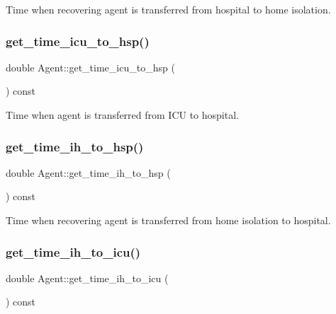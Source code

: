 Time when recovering agent is transferred from hospital to home isolation. 

\mbox{\label{classAgent_ae3b4045c981c44fb9eeed130246ea0a6}} 
\subsubsection{\texorpdfstring{get\+\_\+time\+\_\+icu\+\_\+to\+\_\+hsp()}{get\_time\_icu\_to\_hsp()}}
{\footnotesize\ttfamily double Agent\+::get\+\_\+time\+\_\+icu\+\_\+to\+\_\+hsp (\begin{DoxyParamCaption}{ }\end{DoxyParamCaption}) const\hspace{0.3cm}{\ttfamily [inline]}}



Time when agent is transferred from I\+CU to hospital. 

\mbox{\label{classAgent_af2739d7acc0712cb090fff1d35f6169d}} 
\subsubsection{\texorpdfstring{get\+\_\+time\+\_\+ih\+\_\+to\+\_\+hsp()}{get\_time\_ih\_to\_hsp()}}
{\footnotesize\ttfamily double Agent\+::get\+\_\+time\+\_\+ih\+\_\+to\+\_\+hsp (\begin{DoxyParamCaption}{ }\end{DoxyParamCaption}) const\hspace{0.3cm}{\ttfamily [inline]}}



Time when recovering agent is transferred from home isolation to hospital. 

\mbox{\label{classAgent_ac5987a030791b1d5dd9345cad1b21164}} 
\subsubsection{\texorpdfstring{get\+\_\+time\+\_\+ih\+\_\+to\+\_\+icu()}{get\_time\_ih\_to\_icu()}}
{\footnotesize\ttfamily double Agent\+::get\+\_\+time\+\_\+ih\+\_\+to\+\_\+icu (\begin{DoxyParamCaption}{ }\end{DoxyParamCaption}) const\hspace{0.3cm}{\ttfamily [inline]}}



